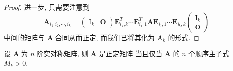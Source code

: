 \documentclass[UTF8]{book}
\begin{document}
\begin{proof}
    进一步, 只需要注意到 
    $$ \boldsymbol{A}_{i_1,i_2,\cdots,i_k} = 
    \begin{pmatrix}
        \boldsymbol{I}_k & \boldsymbol{O}    
    \end{pmatrix}
        \boldsymbol{E}_{i_k,k}^T\cdots\boldsymbol{E}_{i_1,1}^T 
    \boldsymbol{A}
    \boldsymbol{E}_{i_1,1}\cdots\boldsymbol{E}_{i_k,k}
    \begin{pmatrix}
        \boldsymbol{I}_k \\ \boldsymbol{O}    
    \end{pmatrix} $$
    中间的矩阵与 $\boldsymbol{A}$ 合同从而正定, 
    而我们已将其化为 $\boldsymbol{A}_k$ 的形式. 
\end{proof}

\begin{theorem}
    设 $\boldsymbol{A}$ 为 $n$ 阶实对称矩阵, 则 $\boldsymbol{A}$ 是正定矩阵
    当且仅当 $\boldsymbol{A}$ 的 $n$ 个顺序主子式 $M_k>0$.  
\end{theorem}
\end{document}

